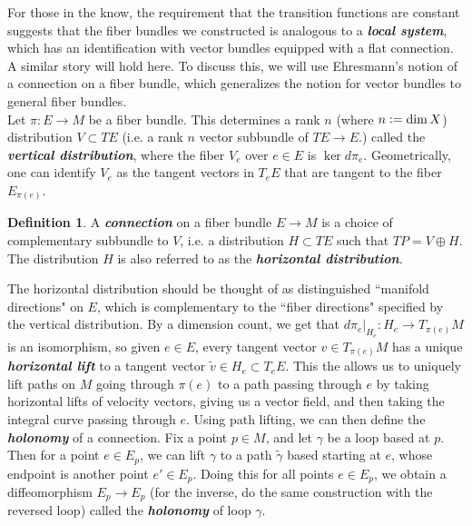 \documentclass[psamsfonts, 12pt]{amsart}
\theoremstyle{definition}
\newtheorem{defn}[thm]{Definition}
\theoremstyle{remark}
\newcommand{\ib}[1]{\textbf{\textit{#1}}}
\newcommand{\defeq}{\vcentcolon=}
\begin{document}
For those in the know, the requirement that the transition functions are constant
suggests that the fiber bundles we constructed is analogous to a \ib{local system},
which has an identification with vector bundles equipped with a flat connection.
A similar story will hold here. To discuss this, we will use Ehresmann's notion
of a connection on a fiber bundle, which generalizes the notion for vector
bundles to general fiber bundles. \\

Let $\pi : E \to M$ be a fiber bundle. This determines a rank $n$
(where $n \defeq \dim X$) distribution $V \subset TE$ (i.e. a rank $n$ vector subbundle
of $TE \to E$.) called the \ib{vertical distribution}, where the fiber $V_e$
over $e \in E$ is $\ker d\pi_e$. Geometrically, one can identify
$V_e$ as the tangent vectors in $T_eE$ that are tangent to the fiber
$E_{\pi(e)}$.
%
\begin{defn}
A \ib{connection} on a fiber bundle $E \to M$ is a choice of complementary
subbundle to $V$, i.e. a distribution $H \subset TE$ such that
$TP = V \oplus H$. The distribution $H$ is also referred to as the
\ib{horizontal distribution}.
\end{defn}
%
The horizontal distribution should be thought of as distinguished
``manifold directions" on $E$, which is complementary to the ``fiber directions"
specified by the vertical distribution. By a dimension count, we get
that $d\pi_e\vert_{H_e} : H_e \to T_{\pi(e)}M$ is an isomorphism, so given
$e \in E$, every tangent vector $v \in T_{\pi(e)}M$ has a unique \ib{horizontal lift}
to a tangent vector $\tilde{v} \in H_e \subset T_eE$. This the allows
us to uniquely lift paths on $M$ going through $\pi(e)$ to a path passing through $e$
by taking horizontal lifts of velocity vectors, giving us a vector field, and then
taking the integral curve passing through $e$. Using path lifting, we can then
define the \ib{holonomy} of a connection. Fix a point $p \in M$, and let $\gamma$
be a loop based at $p$. Then for a point $e \in E_p$, we can lift $\gamma$
to a path $\widetilde{\gamma}$ based starting at $e$, whose endpoint
is another point $e' \in E_p$. Doing this for all points $e \in E_p$, we obtain
a diffeomorphism $E_p \to E_p$ (for the inverse, do the same construction with
the reversed loop) called the \ib{holonomy} of loop $\gamma$. \\
\end{document}
